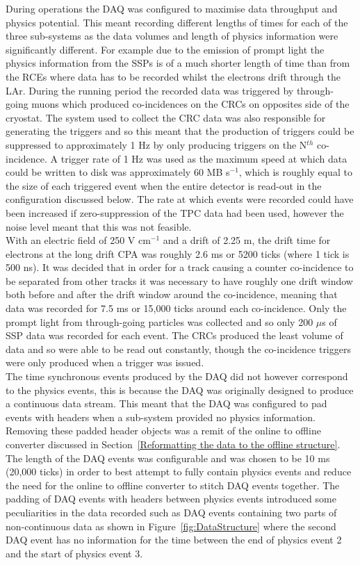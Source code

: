 During operations the DAQ was configured to maximise data throughput and physics potential. This meant recording different lengths of times for each of the three sub-systems as the data volumes and length of physics information were significantly different. For example due to the emission of prompt light the physics information from the SSPs is of a much shorter length of time than from the RCEs where data has to be recorded whilst the electrons drift through the LAr. During the running period the recorded data was triggered by through-going muons which produced co-incidences on the CRCs on opposites side of the cryostat. The system used to collect the CRC data was also responsible for generating the triggers and so this meant that the production of triggers could be suppressed to approximately 1 Hz by only producing triggers on the N$^{th}$ co-incidence. A trigger rate of 1 Hz was used as the maximum speed at which data could be written to disk was approximately 60 MB s$^{-1}$, which is roughly equal to the size of each triggered event when the entire detector is read-out in the configuration discussed below. The rate at which events were recorded could have been increased if zero-suppression of the TPC data had been used, however the noise level meant that this was not feasible. \\ 

With an electric field of 250 V cm$^{-1}$ and a drift of 2.25 m, the drift time for electrons at the long drift CPA was roughly 2.6 ms or 5200 ticks (where 1 tick is 500 ns). It was decided that in order for a track causing a counter co-incidence to be separated from other tracks it was necessary to have roughly one drift window both before and after the drift window around the co-incidence, meaning that data was recorded for 7.5 ms or 15,000 ticks around each co-incidence. Only the prompt light from through-going particles was collected and so only 200 $\mu$s of SSP data was recorded for each event. The CRCs produced the least volume of data and so were able to be read out constantly, though the co-incidence triggers were only produced when a trigger was issued. \\

The time synchronous events produced by the DAQ did not however correspond to the physics events, this is because the DAQ was originally designed to produce a continuous data stream. This meant that the DAQ was configured to pad events with headers when a sub-system provided no physics information. Removing these padded header objects was a remit of the online to offline converter discussed in Section~\ref{Reformatting the data to the offline structure}. The length of the DAQ events was configurable and was chosen to be 10 ms (20,000 ticks) in order to best attempt to fully contain physics events and reduce the need for the online to offline converter to stitch DAQ events together. The padding of DAQ events with headers between physics events introduced some peculiarities in the data recorded such as DAQ events containing two parts of non-continuous data as shown in Figure~\ref{fig:DataStructure} where the second DAQ event has no information for the time between the end of physics event 2 and the start of physics event 3.\\

